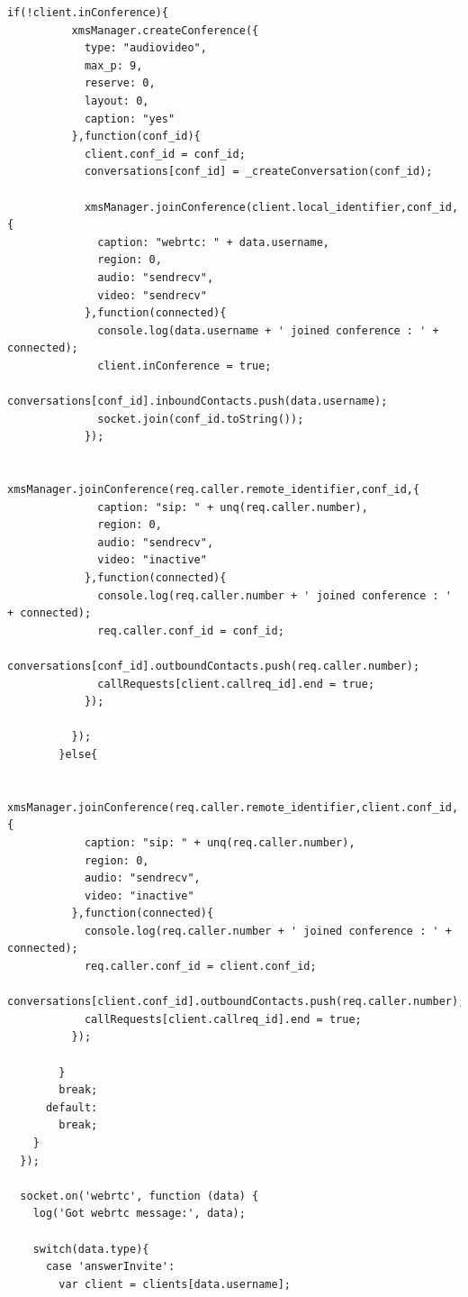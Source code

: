 \begin{appendices}
\begin{lstlisting}[caption={socket.js on Application Server},label={code:server_socket}]
        if(!client.inConference){
          xmsManager.createConference({
            type: "audiovideo",
            max_p: 9,
            reserve: 0,
            layout: 0,
            caption: "yes"
          },function(conf_id){
            client.conf_id = conf_id;
            conversations[conf_id] = _createConversation(conf_id);

            xmsManager.joinConference(client.local_identifier,conf_id,{
              caption: "webrtc: " + data.username,
              region: 0,
              audio: "sendrecv",
              video: "sendrecv"
            },function(connected){
              console.log(data.username + ' joined conference : ' + connected);
              client.inConference = true;
              conversations[conf_id].inboundContacts.push(data.username);
              socket.join(conf_id.toString());
            });
            
            xmsManager.joinConference(req.caller.remote_identifier,conf_id,{
              caption: "sip: " + unq(req.caller.number),
              region: 0,
              audio: "sendrecv",
              video: "inactive"
            },function(connected){
              console.log(req.caller.number + ' joined conference : ' + connected);
              req.caller.conf_id = conf_id;
              conversations[conf_id].outboundContacts.push(req.caller.number);
              callRequests[client.callreq_id].end = true;
            });

          });
        }else{

          xmsManager.joinConference(req.caller.remote_identifier,client.conf_id,{
            caption: "sip: " + unq(req.caller.number),
            region: 0,
            audio: "sendrecv",
            video: "inactive"
          },function(connected){
            console.log(req.caller.number + ' joined conference : ' + connected);
            req.caller.conf_id = client.conf_id;
            conversations[client.conf_id].outboundContacts.push(req.caller.number);
            callRequests[client.callreq_id].end = true;
          });

        }
        break;
      default:
        break;
    }
  });

  socket.on('webrtc', function (data) {
    log('Got webrtc message:', data);
    
    switch(data.type){
      case 'answerInvite':
        var client = clients[data.username];


\end{lstlisting}
\end{appendices}
